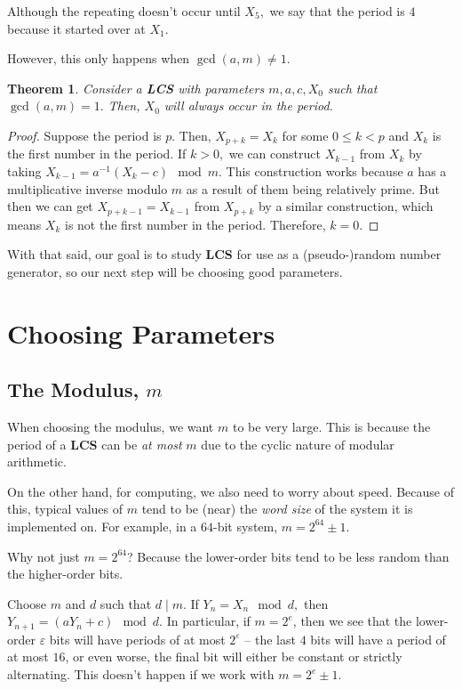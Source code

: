 \documentclass[11pt]{article}
\newcommand{\upright}[1]{{\bf \ttfamily #1}}
\newtheorem{theorem}{Theorem}
\begin{document}
Although the repeating doesn't occur until $X_{5},$ we say that the period is $4$ because it started over at $X_{1}.$

However, this only happens when $\gcd\left(a, m\right) \neq 1.$
\begin{theorem}\label{thm:relprime}
Consider a \upright{LCS} with parameters $m, a, c, X_{0}$ such that $\gcd\left(a, m\right) = 1.$ Then, $X_{0}$ will always occur in the period.
\end{theorem}
\begin{proof}
Suppose the period is $p$. Then, $X_{p+k} = X_{k}$ for some $0 \leq k < p$ and $X_{k}$ is the first number in the period. If $k > 0,$ we can construct $X_{k - 1}$ from $X_{k}$ by taking $X_{k - 1} = a^{-1}\left(X_{k} - c\right) \mod m.$ This construction works because $a$ has a multiplicative inverse modulo $m$ as a result of them being relatively prime. But then we can get $X_{p + k - 1} = X_{k-1}$ from $X_{p+k}$ by a similar construction, which means $X_{k}$ is not the first number in the period. Therefore, $k = 0.$
\end{proof}

With that said, our goal is to study \upright{LCS} for use as a (pseudo-)random number generator, so our next step will be choosing good parameters.

\section{Choosing Parameters}

\subsection{The Modulus, $m$}
When choosing the modulus, we want $m$ to be very large. This is because the period of a \upright{LCS} can be {\it at most} $m$ due to the cyclic nature of modular arithmetic.

On the other hand, for computing, we also need to worry about speed. Because of this, typical values of $m$ tend to be (near) the {\it word size} of the system it is implemented on. For example, in a $64$-bit system, $m = 2^{64} \pm 1$.

Why not just $m = 2^{64}$? Because the lower-order bits tend to be less random than the higher-order bits.

Choose $m$ and $d$ such that $d \mid m$. If $Y_{n} = X_{n} \mod d,$ then $Y_{n + 1} = \left(a Y_{n} + c\right) \mod d.$ In particular, if $m = 2^{e}$, then we see that the lower-order $\varepsilon$ bits will have periods of at most $2^{\varepsilon}$ -- the last $4$ bits will have a period of at most $16$, or even worse, the final bit will either be constant or strictly alternating. This doesn't happen if we work with $m = 2^{e} \pm 1$.
\end{document}
